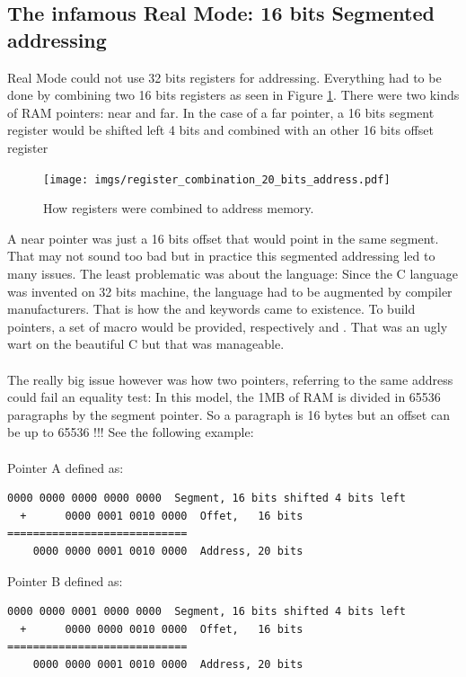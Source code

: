 \documentclass[book.tex]{subfiles}
\begin{document}
\subsection{The infamous Real Mode: 16 bits Segmented addressing}
Real Mode could not use 32 bits registers for addressing. Everything had to be done by combining two 16 bits registers as seen in Figure \ref{fig:register_comb_to_20_bits}. There were two kinds of RAM pointers: near and far. In the case of a far pointer, a 16 bits segment register would be shifted left 4 bits and combined with an other 16 bits offset register\\
\begin{figure}[H]
\centering
\texttt{[image: imgs/register\_combination\_20\_bits\_address.pdf]}
\caption{How registers were combined to address memory.}
\label{fig:register_comb_to_20_bits}
\end{figure}
A near pointer was just a 16 bits offset that would point in the same segment. 
\bigskip
That may not sound too bad but in practice this segmented addressing led to many issues.
The least problematic was about the language: Since the C language was invented on 32 bits machine, the language had to be augmented by compiler manufacturers. That is how the  and  keywords came to existence. To build pointers, a set of macro would be provided, respectively  and . That was an ugly wart on the beautiful C but that was manageable.\\
\\
The really big issue however was how two pointers, referring to the same address could fail an equality test: In this model, the 1MB of RAM is divided in 65536 paragraphs by the segment pointer. So a paragraph is 16 bytes but an offset can be up to 65536 !!! See the following example:\\
\bigskip
\\Pointer A defined as:
\begin{Verbatim}[fontsize=\relsize{-1}]
    0000 0000 0000 0000 0000  Segment, 16 bits shifted 4 bits left  
  +      0000 0001 0010 0000  Offet,   16 bits
============================
    0000 0000 0001 0010 0000  Address, 20 bits
\end{Verbatim}

\bigskip

Pointer B defined as:
\begin{Verbatim}[fontsize=\relsize{-1}]
    0000 0000 0001 0000 0000  Segment, 16 bits shifted 4 bits left  
  +      0000 0000 0010 0000  Offet,   16 bits
============================
    0000 0000 0001 0010 0000  Address, 20 bits
\end{Verbatim}
\end{document}
